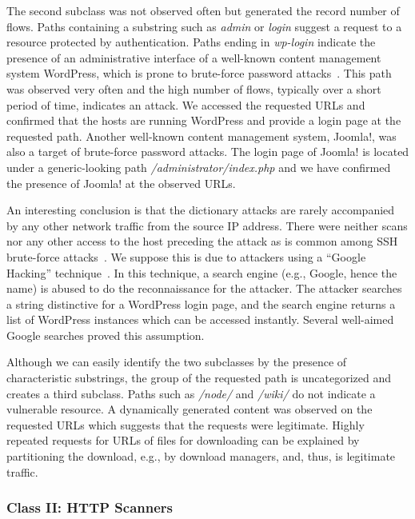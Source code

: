 The second subclass was not observed often but generated the record number of flows. Paths containing a substring such as \textit{admin} or \textit{login} suggest a request to a resource protected by authentication. Paths ending in \textit{wp-login} indicate the presence of an administrative interface of a well-known content management system WordPress, which is prone to brute-force password attacks~\cite{WordPressCodex-2014-Brute}. This path was observed very often and the high number of flows, typically over a short period of time, indicates an attack. We accessed the requested URLs and confirmed that the hosts are running WordPress and provide a login page at the requested path. Another well-known content management system, Joomla!, was also a target of brute-force password attacks. The login page of Joomla! is located under a generic-looking path \textit{/administrator/index.php} and we have confirmed the presence of Joomla! at the observed URLs.

An interesting conclusion is that the dictionary attacks are rarely accompanied by any other network traffic from the source IP address. There were neither scans nor any other access to the host preceding the attack as is common among SSH brute-force attacks~\cite{Vykopal-2013-Flow}. We suppose this is due to attackers using a ``Google Hacking'' technique~\cite{Billig-2008-Evaluation}. In this technique, a search engine (e.g., Google, hence the name) is abused to do the reconnaissance for the attacker. The attacker searches a string distinctive for a WordPress login page, and the search engine returns a list of WordPress instances which can be accessed instantly. Several well-aimed Google searches proved this assumption.

Although we can easily identify the two subclasses by the presence of characteristic substrings, the group of the requested path is uncategorized and creates a third subclass. Paths such as \textit{/node/} and \textit{/wiki/} do not indicate a vulnerable resource. A dynamically generated content was observed on the requested URLs which suggests that the requests were legitimate. Highly repeated requests for URLs of files for downloading can be explained by partitioning the download, e.g., by download managers, and, thus, is legitimate traffic.

\subsubsection{Class II: HTTP Scanners}

